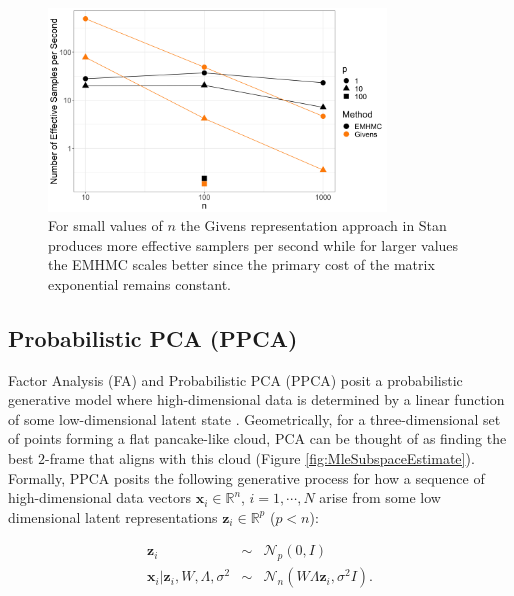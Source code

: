 \documentclass[ba]{imsart}
\newcommand{\mb}[1]{\mathbf{#1}}
\numberwithin{equation}{section}
\theoremstyle{plain}
\begin{document}
\begin{figure}[h]
\centering
\vspace{.1in}
\includegraphics[width=0.8\textwidth]{figures/scaling.png}
\vspace{.05in}
\caption{For small values of $n$ the Givens representation approach in Stan produces more effective samplers per second while for larger values the EMHMC scales better since the primary cost of the matrix exponential remains constant.}
\label{fig:scaling}
\end{figure}

\subsection{Probabilistic PCA (PPCA)}
Factor Analysis (FA) and Probabilistic PCA (PPCA) \citep{tipping1999probabilistic} posit a probabilistic generative model where high-dimensional data is determined by a linear function of some low-dimensional latent state \cite[Chapt.~12]{murphy2012machine}. Geometrically, for a three-dimensional set of points forming a flat pancake-like cloud, PCA can be thought of as finding the best $2$-frame that aligns with this cloud (Figure \ref{fig:MleSubspaceEstimate}). Formally, PPCA posits the following generative process for how a sequence of high-dimensional data vectors $\mathbf{x}_i \in \mathbb{R}^n$, $i = 1, \cdots, N$ arise from some low dimensional latent representations $\mathbf{z}_i \in \mathbb{R}^p$ ($p < n$):

\begin{eqnarray}
\label{eq:PpcaGenerativeProcess}
\mb{z}_i &\sim& \mathcal{N}_p(0, I) \nonumber\\
\mb{x}_i | \mb{z}_i, W, \Lambda, \sigma^2 &\sim& \mathcal{N}_n(W \Lambda \mb{z}_i, \sigma^2 I).
\end{eqnarray}
\end{document}
